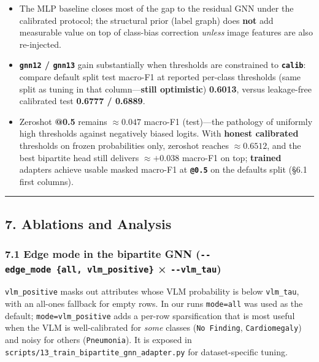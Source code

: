 \documentclass[
  11pt,
]{article}
\providecommand{\tightlist}{%
  \setlength{\itemsep}{0pt}\setlength{\parskip}{0pt}}
\begin{document}
\begin{itemize}
\tightlist
\item
  The MLP baseline closes most of the gap to the residual GNN under the
  calibrated protocol; the structural prior (label graph) does
  \textbf{not} add measurable value on top of class-bias correction
  \emph{unless} image features are also re-injected.
\item
  \textbf{\texttt{gnn12} / \texttt{gnn13}} gain substantially when
  thresholds are constrained to \textbf{\texttt{calib}}: compare default
  split test macro-F1 at reported per-class thresholds (same split as
  tuning in that column---\textbf{still optimistic}) \textbf{0.6013},
  versus leakage-free calibrated test \textbf{0.6777 / 0.6889}.
\item
  Zeroshot \textbf{@0.5} remains \(\approx 0.047\) macro-F1 (test)---the
  pathology of uniformly high thresholds against negatively biased
  logits. With \textbf{honest calibrated} thresholds on frozen
  probabilities only, zeroshot reaches \(\approx 0.6512\), and the best
  bipartite head still delivers \(\approx +0.038\) macro-F1 on top;
  \textbf{trained} adapters achieve usable masked macro-F1 at
  \textbf{\texttt{@0.5}} on the defaults split (§6.1 first columns).
\end{itemize}

\begin{center}\rule{0.5\linewidth}{0.5pt}\end{center}

\subsection{7. Ablations and Analysis}\label{ablations-and-analysis}

\subsubsection{\texorpdfstring{7.1 Edge mode in the bipartite GNN
(\texttt{-\/-edge\_mode\ \{all,\ vlm\_positive\}} ×
\texttt{-\/-vlm\_tau})}{7.1 Edge mode in the bipartite GNN (-\/-edge\_mode \{all, vlm\_positive\} × -\/-vlm\_tau)}}\label{edge-mode-in-the-bipartite-gnn---edge_mode-all-vlm_positive---vlm_tau}

\texttt{vlm\_positive} masks out attributes whose VLM probability is
below \texttt{vlm\_tau}, with an all-ones fallback for empty rows. In
our runs \texttt{mode=all} was used as the default;
\texttt{mode=vlm\_positive} adds a per-row sparsification that is most
useful when the VLM is well-calibrated for \emph{some} classes
(\texttt{No\ Finding}, \texttt{Cardiomegaly}) and noisy for others
(\texttt{Pneumonia}). It is exposed in
\texttt{scripts/13\_train\_bipartite\_gnn\_adapter.py} for
dataset-specific tuning.
\end{document}
